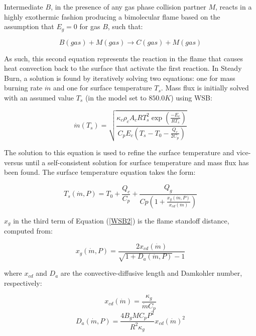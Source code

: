 Intermediate $B$, in the presence of any gas phase collision partner $M$, reacts in a highly exothermic fashion producing a bimolecular flame based on the assumption that $E_g=0$ for gas $B$, such that:

\begin{equation}
B(gas)+M(gas)\rightarrow C(gas)+M(gas)
\end{equation}

As such, this second equation represents the reaction in the flame that causes heat convection back to the surface that activate the first reaction.  In Steady Burn, a solution is found by iteratively solving two equations: one for mass burning rate $\dot{m}$ and one for surface temperature $T_s$.  Mass flux is initially solved with an assumed value $T_s$ (in the model set to $850.0 K$) using WSB:

\begin{equation}
\dot{m}\left(T_s\right)=\sqrt{\frac{\displaystyle \kappa_c \rho_c A_c R T_s^2 \exp\left({\frac{\displaystyle -E_c}{\displaystyle R T_s}}\right)}{\displaystyle C_p E_c \left(T_s - T_0 - \frac{Q_c}{2 C_p}\right)}}
\label{WSB1}
\end{equation}

The solution to this equation is used to refine the surface temperature and vice-versus until a self-consistent solution for surface temperature and mass flux has been found.  The surface temperature equation takes the form:

\begin{equation}
T_s(\dot{m},P)=T_0 + \frac{\displaystyle Q_c}{\displaystyle C_p} + \frac{Q_g}{Cp\left(1+\frac{\displaystyle x_g\left(\dot{m},P\right)}{\displaystyle x_{cd}(\dot{m})}\right)}
\label{WSB2}
\end{equation}

$x_g$ in the third term of Equation (\ref{WSB2}) is the flame standoff distance, computed from:

\begin{equation}
x_g\left(\dot{m},P\right)=\frac{2 x_{cd}\left(\dot{m}\right)}{\displaystyle \sqrt{1 + D_a\left(\dot{m},P\right)} - 1}
\label{WSB3}
\end{equation}

where $x_{cd}$ and $D_a$ are the convective-diffusive length and Damkohler number, respectively:

\begin{equation}
x_{cd} \left(\dot{m}\right)=\frac{\kappa_g}{\displaystyle \dot{m} C_p}
\label{WSB4}
\end{equation}
\begin{equation}
D_a\left(\dot{m},P\right) = \frac{4 B_g M C_p P^2}{\displaystyle R^2 \kappa_g} x_{cd}\left(\dot{m}\right)^2
\label{WSB5}
\end{equation}

